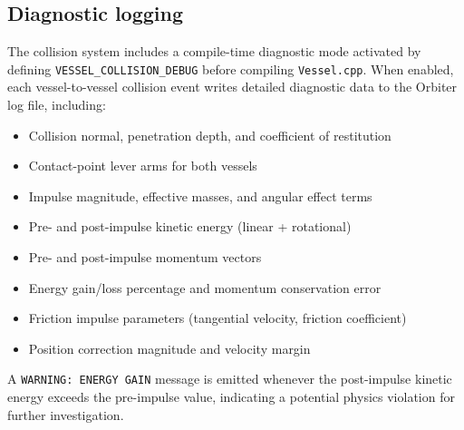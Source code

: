 \documentclass[Orbiter Technical Reference.tex]{subfiles}
\begin{document}
\subsection{Diagnostic logging}
\label{ssec:debug}
The collision system includes a compile-time diagnostic mode activated
by defining \texttt{VESSEL\_COLLISION\_DEBUG} before compiling
\texttt{Vessel.cpp}.
When enabled, each vessel-to-vessel collision event writes detailed
diagnostic data to the Orbiter log file, including:
\begin{itemize}
\item Collision normal, penetration depth, and coefficient of restitution
\item Contact-point lever arms for both vessels
\item Impulse magnitude, effective masses, and angular effect terms
\item Pre- and post-impulse kinetic energy (linear + rotational)
\item Pre- and post-impulse momentum vectors
\item Energy gain/loss percentage and momentum conservation error
\item Friction impulse parameters (tangential velocity, friction coefficient)
\item Position correction magnitude and velocity margin
\end{itemize}
A \texttt{WARNING: ENERGY GAIN} message is emitted whenever the
post-impulse kinetic energy exceeds the pre-impulse value, indicating
a potential physics violation for further investigation.
\end{document}

